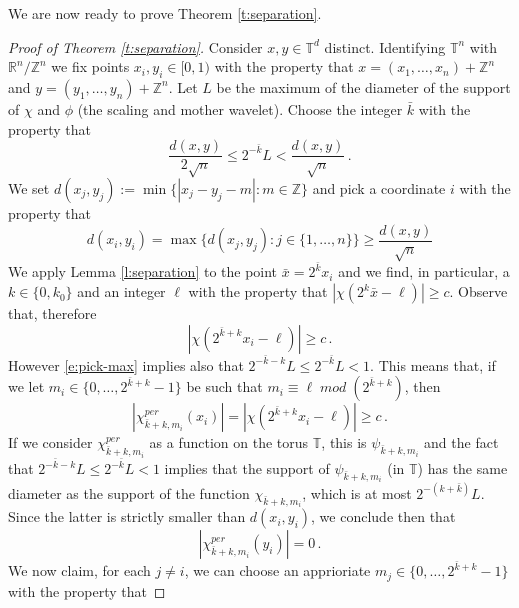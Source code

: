 \documentclass[11pt,reqno]{amsart}
\theoremstyle{definition}
\numberwithin{equation}{section}
\begin{document}
We are now ready to prove Theorem \ref{t:separation}. 

\begin{proof}[Proof of Theorem \ref{t:separation}]
Consider $x,y\in \mathbb T^d$ distinct. Identifying $\mathbb T^n$ with $\mathbb R^n/\mathbb Z^n$ we fix points $x_i, y_i\in [0,1)$ with the property that $x = (x_1, \ldots, x_n) + \mathbb Z^n$ and $y = (y_1, \ldots , y_n) + \mathbb Z^n$. Let $L$ be the maximum of the diameter of the support of $\chi$ and $\phi$ (the scaling and mother wavelet). Choose the integer $\bar{k}$ with the property that 
\begin{equation}\label{e:pick-max}
\frac{d(x,y)}{2\sqrt{n}} \leq 2^{-{\bar{k}}} L < \frac{d (x,y)}{\sqrt{n}}\, .
\end{equation}
We set $d(x_j, y_j) := \min \{ |x_j-y_j-m|: m \in \mathbb Z\}$ and 
pick a coordinate $i$ with the property that 
\[
d(x_i, y_i) = \max \{ d(x_j, y_j) : j\in \{1, \ldots , n\}\} \geq \frac{d(x,y)}{\sqrt{n}}
\]
We apply Lemma \ref{l:separation} to the point $\bar{x} = 2^{\bar k} x_i$ and we find, in particular, a $k\in \{0, k_0\}$ and an integer $\ell$ with the property that $|\chi (2^k \bar{x} - \ell)| \geq c$. Observe that, therefore
\begin{equation}\label{e:comparison}
\left|\chi \left(2^{\bar{k}+k} x_i - \ell\right)\right|\geq c\, .
\end{equation}
However \eqref{e:pick-max} implies also that $2^{-\bar{k}-k} L \leq 2^{-\bar{k}} L <1$. This means that, if we let $m_i \in \{0, \ldots, 2^{\bar k+k}-1\}$ be such that $m_i \equiv \ell \; mod \; (2^{\bar k+k})$, then  
\begin{equation}\label{e:first-bound}
|\chi^{per}_{\bar{k}+k, m_i} (x_i)| = |\chi (2^{\bar{k}+k} x_i - \ell)|\geq c\, .
\end{equation}
If we consider $\chi^{per}_{\bar{k}+k, m_i}$ as a function on the torus $\mathbb T$, this is $\psi_{\bar{k}+k, m_i}$ and the fact that $2^{-\bar{k}-k} L \leq 2^{-\bar{k}} L <1$ implies that the support of $\psi_{\bar{k}+k, m_i}$ (in $\mathbb T$) has the same diameter as the support of the function $\chi_{\bar{k}+k, m_i}$, which is at most $2^{-(k+\bar{k})} L$. Since the latter is strictly smaller than $d (x_i, y_i)$, we conclude then that 
\begin{equation}\label{e:vanishes}
|\chi^{per}_{\bar{k}+k, m_i} (y_i)|=0\, .
\end{equation}
We now claim, for each $j\neq i$, we can choose an apprioriate $m_j\in \{0, \ldots, 2^{\bar{k}+k}-1\}$ with the property that 

\end{proof}
\end{document}
